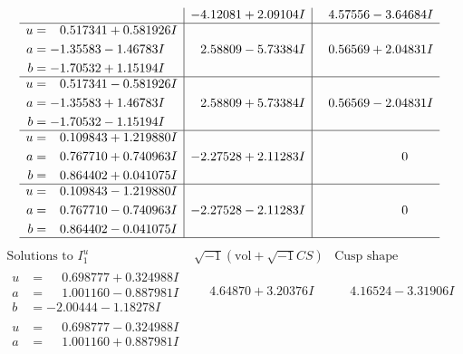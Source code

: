 \documentclass[1p]{elsarticle_modified}
\theoremstyle{definition}
\newcommand{\I}{\sqrt{-1}}
\begin{document}
$$\begin{array}{c|c|c}
 & -4.12081 + 2.09104 I & \phantom{-}4.57556 - 3.64684 I \\ \hline\begin{aligned}
u &= \phantom{-}0.517341 + 0.581926 I \\
a &= -1.35583 - 1.46783 I \\
b &= -1.70532 + 1.15194 I\end{aligned}
 & \phantom{-}2.58809 - 5.73384 I & \phantom{-}0.56569 + 2.04831 I \\ \hline\begin{aligned}
u &= \phantom{-}0.517341 - 0.581926 I \\
a &= -1.35583 + 1.46783 I \\
b &= -1.70532 - 1.15194 I\end{aligned}
 & \phantom{-}2.58809 + 5.73384 I & \phantom{-}0.56569 - 2.04831 I \\ \hline\begin{aligned}
u &= \phantom{-}0.109843 + 1.219880 I \\
a &= \phantom{-}0.767710 + 0.740963 I \\
b &= \phantom{-}0.864402 + 0.041075 I\end{aligned}
 & -2.27528 + 2.11283 I & \phantom{-0.000000 } 0 \\ \hline\begin{aligned}
u &= \phantom{-}0.109843 - 1.219880 I \\
a &= \phantom{-}0.767710 - 0.740963 I \\
b &= \phantom{-}0.864402 - 0.041075 I\end{aligned}
 & -2.27528 - 2.11283 I & \phantom{-0.000000 } 0\\
 \hline 
 \end{array}$$\newpage$$\begin{array}{c|c|c}  
\text{Solutions to }I^u_{1}& \I (\text{vol} + \sqrt{-1}CS) & \text{Cusp shape}\\
 \hline 
\begin{aligned}
u &= \phantom{-}0.698777 + 0.324988 I \\
a &= \phantom{-}1.001160 - 0.887981 I \\
b &= -2.00444 - 1.18278 I\end{aligned}
 & \phantom{-}4.64870 + 3.20376 I & \phantom{-}4.16524 - 3.31906 I \\ \hline\begin{aligned}
u &= \phantom{-}0.698777 - 0.324988 I \\
a &= \phantom{-}1.001160 + 0.887981 I \\

\end{aligned}
\end{array}$$
\end{document}
